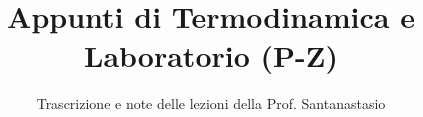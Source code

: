 \documentclass[a4paper,12pt]{article}
\title{Appunti di Termodinamica e Laboratorio (P-Z)}
\author{Trascrizione e note delle lezioni della Prof. Santanastasio}
\date{}
\begin{document}
\maketitle
\projectintro
\tableofcontents
\newpage

\end{document}
